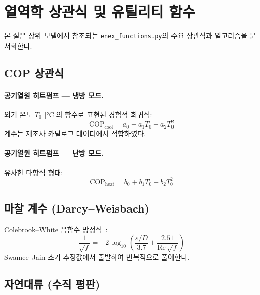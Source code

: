 \section{열역학 상관식 및 유틸리티 함수}
\label{sec:enex-functions}

본 절은 상위 모델에서 참조되는 \texttt{enex\_functions.py}의 주요 상관식과 알고리즘을 문서화한다.

\subsection{COP 상관식}

\paragraph{공기열원 히트펌프 --- 냉방 모드.}
외기 온도 $T_0$ [°C]의 함수로 표현된 경험적 회귀식:
\begin{equation}\label{eq:cop-ashp-cool}
  \text{COP}_\text{cool} = a_0 + a_1 T_0 + a_2 T_0^2
\end{equation}
계수는 제조사 카탈로그 데이터에서 적합하였다.

\paragraph{공기열원 히트펌프 --- 난방 모드.}
유사한 다항식 형태:
\begin{equation}\label{eq:cop-ashp-heat}
  \text{COP}_\text{heat} = b_0 + b_1 T_0 + b_2 T_0^2
\end{equation}



\subsection{마찰 계수 (Darcy--Weisbach)}

Colebrook--White 음함수 방정식~\cite{colebrook1939}:
\begin{equation}\label{eq:colebrook}
  \frac{1}{\sqrt{f}} = -2\,\log_{10}\!\left(\frac{\varepsilon/D}{3.7} + \frac{2.51}{\text{Re}\,\sqrt{f}}\right)
\end{equation}
Swamee--Jain 초기 추정값에서 출발하여 반복적으로 풀이한다.

\subsection{자연대류 (수직 평판)}

